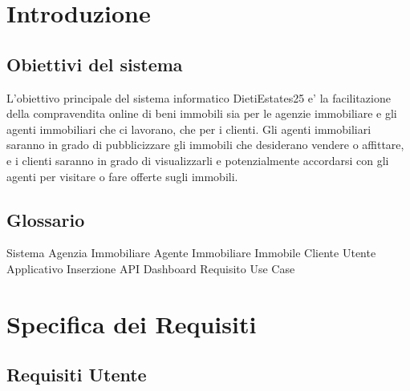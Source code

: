 
\chapter{Introduzione}
    \section{Obiettivi del sistema}
        L'obiettivo principale del sistema informatico DietiEstates25 e' la facilitazione della compravendita online di beni immobili sia per le agenzie immobiliare e gli agenti immobiliari che ci lavorano, che per i clienti. Gli agenti immobiliari saranno in grado di pubblicizzare gli immobili che desiderano vendere o affittare, e i clienti saranno in grado di visualizzarli e potenzialmente accordarsi con gli agenti per visitare o fare offerte sugli immobili.
    \section{Glossario}
    Sistema
    Agenzia Immobiliare
    Agente Immobiliare 
    Immobile
    Cliente
    Utente
    Applicativo
    Inserzione
    API
    Dashboard
    Requisito
    Use Case
    
\chapter{Specifica dei Requisiti}





    \section{Requisiti Utente}
